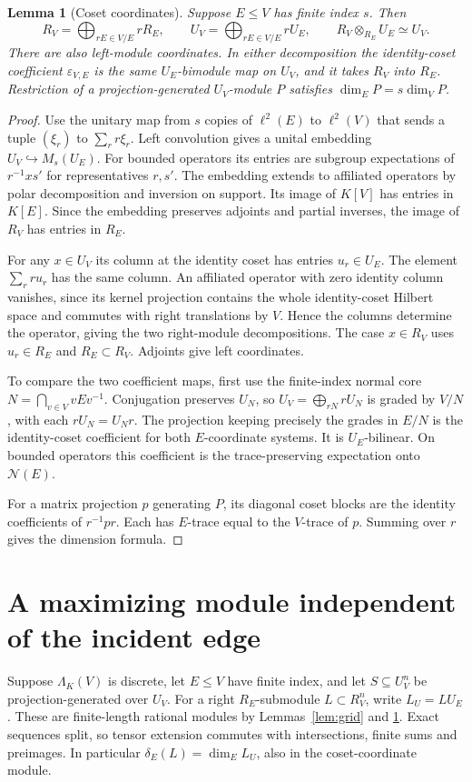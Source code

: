 \documentclass[11pt,a4paper,reqno]{amsart}
\numberwithin{equation}{section}
\newtheorem{lemma}[theorem]{Lemma}
\theoremstyle{remark}
\newcommand{\N}{\mathcal N}
\begin{document}
\begin{lemma}[Coset coordinates]\label{lem:coset}
Suppose \(E\le V\) has finite index \(s\). Then
\[
 R_V=\bigoplus_{rE\in V/E}rR_E,\qquad
 U_V=\bigoplus_{rE\in V/E}rU_E,\qquad
 R_V\otimes_{R_E}U_E\simeq U_V .
\]
There are also left-module coordinates. In either decomposition the identity-coset coefficient \(\varepsilon_{V,E}\) is the same \(U_E\)-bimodule map on \(U_V\), and it takes \(R_V\) into \(R_E\). Restriction of a projection-generated \(U_V\)-module \(P\) satisfies \(\dim_E P=s\dim_V P\).
\end{lemma}
\begin{proof}
Use the unitary map from \(s\) copies of \(\ell^2(E)\) to \(\ell^2(V)\) that sends a tuple \((\xi_r)\) to \(\sum_r r\xi_r\). Left convolution gives a unital embedding \(U_V\hookrightarrow M_s(U_E)\). For bounded operators its entries are subgroup expectations of \(r^{-1}xs'\) for representatives \(r,s'\). The embedding extends to affiliated operators by polar decomposition and inversion on support. Its image of \(K[V]\) has entries in \(K[E]\). Since the embedding preserves adjoints and partial inverses, the image of \(R_V\) has entries in \(R_E\).

For any \(x\in U_V\) its column at the identity coset has entries \(u_r\in U_E\). The element \(\sum_r r u_r\) has the same column. An affiliated operator with zero identity column vanishes, since its kernel projection contains the whole identity-coset Hilbert space and commutes with right translations by \(V\). Hence the columns determine the operator, giving the two right-module decompositions. The case \(x\in R_V\) uses \(u_r\in R_E\) and \(R_E\subset R_V\). Adjoints give left coordinates.

To compare the two coefficient maps, first use the finite-index normal core \(N=\bigcap_{v\in V}vEv^{-1}\). Conjugation preserves \(U_N\), so \(U_V=\bigoplus_{rN}rU_N\) is graded by \(V/N\), with each \(rU_N=U_Nr\). The projection keeping precisely the grades in \(E/N\) is the identity-coset coefficient for both \(E\)-coordinate systems. It is \(U_E\)-bilinear. On bounded operators this coefficient is the trace-preserving expectation onto \(\N(E)\).

For a matrix projection \(p\) generating \(P\), its diagonal coset blocks are the identity coefficients of \(r^{-1}pr\). Each has \(E\)-trace equal to the \(V\)-trace of \(p\). Summing over \(r\) gives the dimension formula.
\end{proof}

\section{A maximizing module independent of the incident edge}
Suppose \(\Lambda_K(V)\) is discrete, let \(E\le V\) have finite index, and let \(S\subseteq U_V^n\) be projection-generated over \(U_V\). For a right \(R_E\)-submodule \(L\subset R_V^n\), write \(L_U=LU_E\). These are finite-length rational modules by Lemmas~\ref{lem:grid} and \ref{lem:coset}. Exact sequences split, so tensor extension commutes with intersections, finite sums and preimages. In particular \(\delta_E(L)=\dim_E L_U\), also in the coset-coordinate module.
\end{document}
